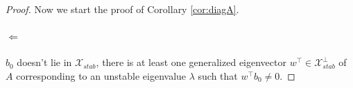 \begin{proof}
Now we start the proof of Corollary \ref{cor:diagA}. \paragraph{\(\Leftarrow\)}









\(b_0\) doesn't lie in \(\mathcal{X}_{stab}\), there is at least one generalized eigenvector \(w^\top\in \mathcal{X}_{stab}^\perp\) of \(A\) corresponding to an unstable eigenvalue \(\lambda\) such that \(w^\top b_0 \neq 0\).


\end{proof}

